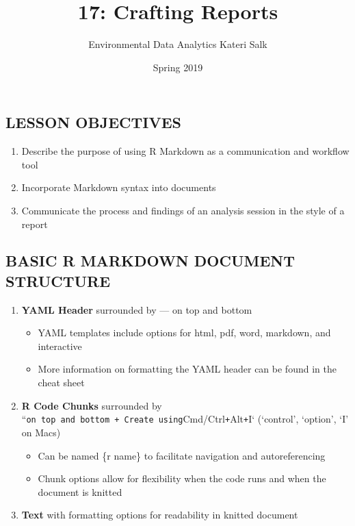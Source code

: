 \documentclass[]{article}
\title{17: Crafting Reports}
\author{Environmental Data Analytics \textbar{} Kateri Salk}
\date{Spring 2019}
\providecommand{\tightlist}{%
  \setlength{\itemsep}{0pt}\setlength{\parskip}{0pt}}
\begin{document}
\maketitle

\subsection{LESSON OBJECTIVES}\label{lesson-objectives}

\begin{enumerate}
\def\labelenumi{\arabic{enumi}.}
\tightlist
\item
  Describe the purpose of using R Markdown as a communication and
  workflow tool
\item
  Incorporate Markdown syntax into documents
\item
  Communicate the process and findings of an analysis session in the
  style of a report
\end{enumerate}

\subsection{BASIC R MARKDOWN DOCUMENT
STRUCTURE}\label{basic-r-markdown-document-structure}

\begin{enumerate}
\def\labelenumi{\arabic{enumi}.}
\tightlist
\item
  \textbf{YAML Header} surrounded by --- on top and bottom

  \begin{itemize}
  \tightlist
  \item
    YAML templates include options for html, pdf, word, markdown, and
    interactive
  \item
    More information on formatting the YAML header can be found in the
    cheat sheet
  \end{itemize}
\item
  \textbf{R Code Chunks} surrounded by
  ``\texttt{on\ top\ and\ bottom\ +\ Create\ using}Cmd/Ctrl\texttt{+}Alt\texttt{+}I`
  (`control', `option', `I' on Macs)

  \begin{itemize}
  \tightlist
  \item
    Can be named \{r name\} to facilitate navigation and autoreferencing
  \item
    Chunk options allow for flexibility when the code runs and when the
    document is knitted
  \end{itemize}
\item
  \textbf{Text} with formatting options for readability in knitted
  document
\end{enumerate}
\end{document}
